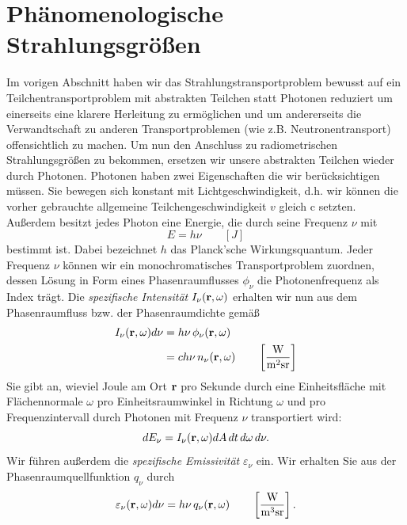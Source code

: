 	\section{Phänomenologische Strahlungsgrößen}\label{subsec:strahlungsgroessen}
	Im vorigen Abschnitt haben wir das Strahlungstransportproblem bewusst auf ein Teilchentransportproblem mit abstrakten Teilchen statt Photonen reduziert um einerseits eine klarere Herleitung zu ermöglichen und um andererseits die Verwandtschaft zu anderen Transportproblemen (wie z.B. Neutronentransport) offensichtlich zu machen. Um nun den Anschluss zu radiometrischen Strahlungsgrößen zu bekommen, ersetzen wir unsere abstrakten Teilchen wieder durch Photonen. Photonen haben zwei Eigenschaften die wir berücksichtigen müssen. Sie bewegen sich konstant mit Lichtgeschwindigkeit, d.h. wir können die vorher gebrauchte allgemeine Teilchengeschwindigkeit $v$ gleich $\text{c}$ setzten. Außerdem besitzt jedes Photon eine Energie, die durch seine Frequenz $\nu$ mit 
	$$E=h\nu \qquad[J]$$
	bestimmt ist. Dabei bezeichnet $h$ das Planck'sche Wirkungsquantum.
	Jeder Frequenz $\nu$ können wir ein monochromatisches Transportproblem zuordnen, dessen Lösung in Form eines Phasenraumflusses $\phi_\nu$ die Photonenfrequenz als Index trägt.
	Die {\em spezifische Intensität} $I_\nu(\mathbf{r},\omega)$ erhalten wir nun aus dem Phasenraumfluss bzw. der Phasenraumdichte gemäß
	\begin{align}\label{eq:intensity_def}
		I_\nu(\mathbf{r},\omega)d\nu & = h\nu\,\phi_\nu(\mathbf{r},\omega)\\
		                       & = c h\nu\,n_\nu(\mathbf{r},\omega) \qquad \left[\frac{\text{W}}{\text{m}^2\text{sr}}\right] \nonumber
	\end{align}
	Sie gibt an, wieviel Joule am Ort $\mathbf{r}$ pro Sekunde durch eine Einheitsfläche mit Flächennormale $\omega$ pro Einheitsraumwinkel in Richtung $\omega$ und pro Frequenzintervall durch Photonen mit Frequenz $\nu$ transportiert wird:
	$$dE_\nu=I_\nu(\mathbf{r},\omega) dA\,dt\,d\omega\,d\nu.$$
	Wir führen außerdem die {\em spezifische Emissivität} $\varepsilon_\nu$ ein. Wir erhalten Sie aus der Phasenraumquellfunktion $q_\nu$ durch
	\begin{equation}\label{eq:emissivity_def}
		\varepsilon_\nu(\mathbf{r},\omega)d\nu = h\nu\,q_\nu(\mathbf{r},\omega) \qquad \left[\frac{\text{W}}{\text{m}^3\text{sr}}\right].
	\end{equation}
	
